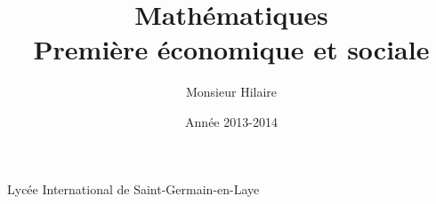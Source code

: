 %

   	 
	
\usepackage[T1]{fontenc} 
\usepackage[a4paper,left=2cm,right=2cm,top=2cm,bottom=2cm]{geometry} 
\usepackage{lmodern} 
\usepackage{graphicx} 
\usepackage{fancyhdr}

\usepackage{textcomp}
\usepackage{texgraph}
\usepackage{pgf,tikz}
\usetikzlibrary{arrows}

\usepackage{variations}


\ifdefined\COMPLETE
\else
    \newcommand{\COMPLETE}
\fi                        %
                          

\title {  \Huge     Mathématiques\\
             Première économique et sociale \\
       }

\author{ \Large   Monsieur Hilaire  }

\date  { \large  Année 2013-2014   }





\maketitle\thispagestyle{empty} %
\vfill

\centerline {\large  Lycée International de Saint-Germain-en-Laye} 

\newpage

\thispagestyle{empty}

